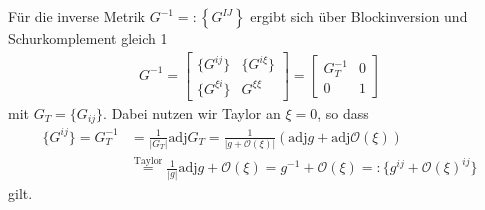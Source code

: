 \documentclass[a4paper,11pt]{scrartcl}
\newcommand{\landau}{\mathcal{O}}
\newcommand{\adj}{\text{adj}}
\begin{document}
Für die inverse Metrik \( G^{-1} =: \left\{ G^{IJ} \right\} \) ergibt sich über Blockinversion und Schurkomplement gleich 1
\begin{align}
  G^{-1} =
    \begin{bmatrix}
      \{G^{ij}\} & \{G^{i\xi}\} \\
      \{G^{\xi i}\} & G^{\xi\xi}
    \end{bmatrix} 
    =
    \begin{bmatrix}
      G_{T}^{-1} & 0 \\
      0 & 1
    \end{bmatrix}
\end{align}
mit \( G_{T} = \{G_{ij}\} \). 
Dabei nutzen wir Taylor an \( \xi = 0 \), so dass
\begin{align}
  \{G^{ij}\} =
  G_{T}^{-1} &= \frac{1}{|G_{T}|}\adj G_{T}
            = \frac{1}{|g + \landau(\xi)|}\left( \adj g + \adj\landau(\xi) \right) \\
            &\overset{\text{Taylor}}{=} \frac{1}{|g|}\adj g + \landau(\xi)
            = g^{-1} + \landau(\xi) =: \{g^{ij} + \landau(\xi)^{ij}\}
\end{align}
gilt.
\end{document}
